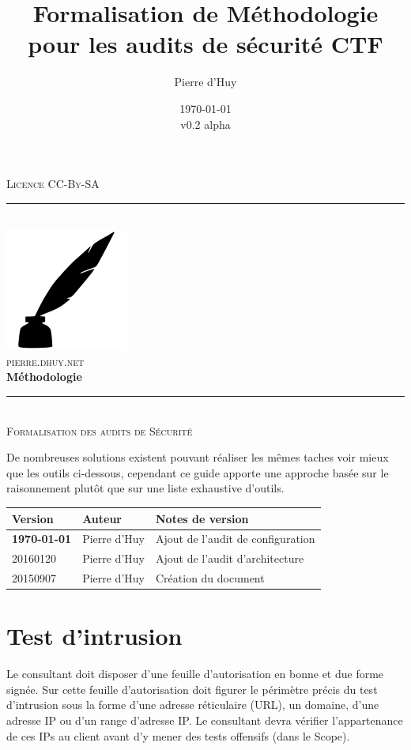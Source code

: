 \documentclass[twoside,a4paper,12pt,titlepage]{book}
\title{Formalisation de Méthodologie pour les audits de sécurité CTF}
\author{Pierre d'Huy}
\date{\today\\v0.2 alpha}
\newcommand{\HRule}{\rule{\linewidth}{0.5mm}}
\begin{document}
\begin{titlepage}
	\begin{center}
		\textsc{\footnotesize Licence CC-By-SA}
		\HRule \\[2cm]
		\hspace{1cm}\includegraphics[width=.3\textwidth]{feather.png}\\
		\textsc{\large pierre.dhuy.net}\\[2.5cm]
			{ \huge \bfseries Méthodologie \\[0.3cm] }
		\HRule \\[0.5cm]
		\textsc{\huge Formalisation des audits de Sécurité}
	\end{center}
\end{titlepage}

\begin{Warning}
De nombreuses solutions existent pouvant réaliser les mêmes taches voir mieux que les outils ci-dessous, cependant ce guide apporte une approche basée sur le raisonnement plutôt que sur une liste exhaustive d'outils.
\end{Warning}
\vfill
\begin{tabular}{|p{2cm} | p{4cm} | p{8cm}|}
	\hline
	Version & Auteur & Notes de version\\
	\hline
	\textbf{\today} & Pierre d'Huy & Ajout de l'audit de configuration\\
	\hline
	20160120 & Pierre d'Huy & Ajout de l'audit d'architecture\\
	\hline
	20150907 & Pierre d'Huy & Création du document\\
	\hline	
\end{tabular}
\tableofcontents
\mainmatter
\chapter{Test d'intrusion}
\begin{Pre}Le consultant doit disposer d'une feuille d'autorisation en bonne et due forme signée. Sur cette feuille d'autorisation doit figurer le périmètre précis du test d'intrusion sous la forme d'une adresse réticulaire (\gls{URL}), un domaine, d'une adresse IP ou d'un range d'adresse IP. Le consultant devra vérifier l'appartenance de ces IPs au client avant d'y mener des tests offensifs (dans le Scope).\end{Pre}
\end{document}
